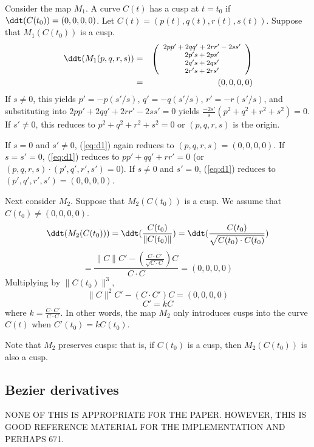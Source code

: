 \documentclass[12pt]{article}
\begin{document}
Consider the map $M_1$.
A curve $C(t)$ has a cusp at $t=t_0$ if $\ddt(C(t_0)) = (0,0,0,0)$.
Let $C(t) = (p(t),q(t),r(t),s(t))$.
Suppose that $M_1(C(t_0))$ is a cusp.
\begin{eqnarray}
\label{eq:d1}
\ddt(M_1(p,q,r,s)) & = & 
\mbox{\footnotesize{$\left( \begin{array}{c}
	2pp' + 2qq' + 2rr'  - 2ss' \\
	2p's + 2ps' \\
	2q's + 2qs' \\
        2r's + 2rs' 
\end{array} \right)$}} \nonumber \\
& = & (0,0,0,0)
\end{eqnarray}
If $s \neq 0$, this yields
$       p' = -p(s'/s)$,
$       q' = -q(s'/s)$,
$       r' = -r(s'/s)$,
and substituting into $2pp' + 2qq' + 2rr'  - 2ss' = 0$ yields
$        \frac{-2s'}{s}(p^2+q^2+r^2+s^2) = 0 $.
If $s'\neq 0$, this reduces to
$ p^2 + q^2 + r^2 + s^2 = 0$
or $(p,q,r,s)$ is the origin.

If $s = 0$ and $s' \neq 0$,
(\ref{eq:d1}) again reduces to $(p,q,r,s) = (0,0,0,0)$.
If $s = s' = 0$,
(\ref{eq:d1}) reduces to $pp' + qq' + rr' = 0$ 
(or $(p,q,r,s) \cdot (p',q',r',s') = 0$).
If $s \neq 0$ and $s' = 0$,
(\ref{eq:d1}) reduces to $(p',q',r',s') = (0,0,0,0)$.

Next consider $M_2$.
Suppose that $M_2(C(t_0))$ is a cusp.
We assume that $C(t_0) \neq (0,0,0,0)$.
\[ 
\ddt(M_2(C(t_0))) 
= \ddt(\frac{C(t_0)}{\|C(t_0)\|})
= \ddt(\frac{C(t_0)}{\sqrt{C(t_0) \cdot C(t_0)}})
\]
\[
= \frac{\|C\| C' - (\frac{C \cdot C'}{\sqrt{C \cdot C}}) C}{C \cdot C}
= (0,0,0,0)
\]
Multiplying by $\|C(t_0)\|^3$,
\[
\|C\|^2 C' - (C \cdot C') C = (0,0,0,0)
\]
\[
C' = kC
\]
where $k = \frac{C \cdot C'}{C \cdot C}$.
In other words,
the map $M_2$ only introduces cusps into the curve $C(t)$ when
$C'(t_0) = kC(t_0)$.

Note that $M_2$ preserves cusps: that is, if $C(t_0)$ is a cusp,
then $M_2(C(t_0))$ is also a cusp.
\QED

\clearpage

\subsection{Bezier derivatives}

NONE OF THIS IS APPROPRIATE FOR THE PAPER. 
HOWEVER, THIS IS GOOD REFERENCE MATERIAL FOR THE IMPLEMENTATION AND PERHAPS 671.
\end{document}
